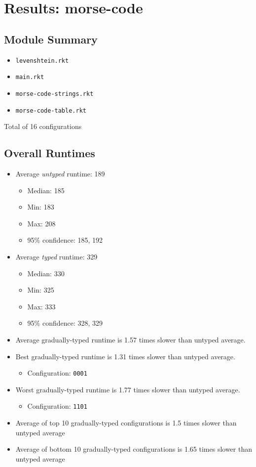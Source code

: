 \documentclass{article}
\newcommand{\mono}[1]{\texttt{#1}}
\begin{document}
\section{Results: morse-code}

\subsection{Module Summary}
\begin{itemize}
\item \mono{levenshtein.rkt}
\item \mono{main.rkt}
\item \mono{morse-code-strings.rkt}
\item \mono{morse-code-table.rkt}\end{itemize}
Total of 16 configurations

\subsection{Overall Runtimes}
\begin{itemize}
\item Average \emph{untyped} runtime: 189
  \begin{itemize}
  \item Median: 185
  \item Min: 183
  \item Max: 208
  \item 95\% confidence: 185, 192
  \end{itemize}
\item Average \emph{typed} runtime: 329
  \begin{itemize}
  \item Median: 330
  \item Min: 325
  \item Max: 333
  \item 95\% confidence: 328, 329
  \end{itemize}
\item Average gradually-typed runtime is 1.57 times slower than untyped average.
\item Best gradually-typed runtime is 1.31 times slower than untyped average.
\begin{itemize}\item Configuration: \mono{0001}\end{itemize}
\item Worst gradually-typed runtime is 1.77 times slower than untyped average.
\begin{itemize}\item Configuration: \mono{1101}\end{itemize}
\item Average of top 10 gradually-typed configurations is 1.5 times slower than untyped average
\item Average of bottom 10 gradually-typed configurations is 1.65 times slower than untyped average
\end{itemize}
\end{document}

